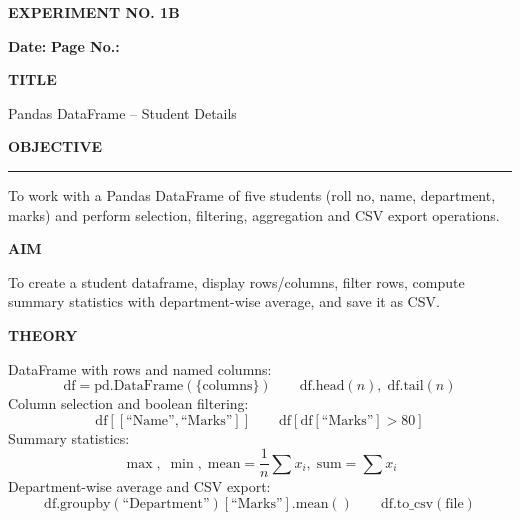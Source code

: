 \documentclass[11pt,twoside]{article}
\newcommand{\expheading}[1]{{\fontsize{14}{17}\selectfont\textbf{#1}\par}}
\newcommand{\fullrule}{\noindent\rule{\textwidth}{0.6pt}\par}
\begin{document}
{\setlength{\parskip}{1pt}\setlength{\abovedisplayskip}{2pt}\setlength{\belowdisplayskip}{2pt}
\begin{center}
\expheading{EXPERIMENT NO. 1B}
\end{center}
\vspace{2pt}

\noindent\textbf{Date:} \underline{\hspace{2.6cm}} \hfill \textbf{Page No.:} \underline{\hspace{2.6cm}}\par
\vspace{6pt}

\expheading{TITLE}
\vspace{4pt}
\noindent Pandas DataFrame -- Student Details\par
\vspace{4pt}

\expheading{OBJECTIVE}
\vspace{2pt}
\fullrule
\vspace{4pt}
\noindent To work with a Pandas DataFrame of five students (roll no, name, department, marks) and perform selection, filtering, aggregation and CSV export operations. \par
\vspace{4pt}

\expheading{AIM}
\vspace{4pt}
\noindent To create a student dataframe, display rows/columns, filter rows, compute summary statistics with department-wise average, and save it as CSV. \par
\vspace{4pt}

\expheading{THEORY}
\vspace{4pt}
DataFrame with rows and named columns:
\[\text{df}=\text{pd.DataFrame}(\{\text{columns}\})\qquad\text{df.head}(n),\; \text{df.tail}(n)\]
Column selection and boolean filtering:
\[\text{df}[[\text{``Name''},\text{``Marks''}]]\qquad \text{df}[\text{df}[\text{``Marks''}]>80]\]
Summary statistics:
\[\max,\; \min,\; \text{mean}=\frac{1}{n}\sum x_i,\; \text{sum}=\sum x_i\]
Department-wise average and CSV export:
\[\text{df.groupby}(\text{``Department''})[\text{``Marks''}].\text{mean}()\qquad \text{df.to\_csv}(\text{file})\]
\vspace{4pt}

}
\end{document}
